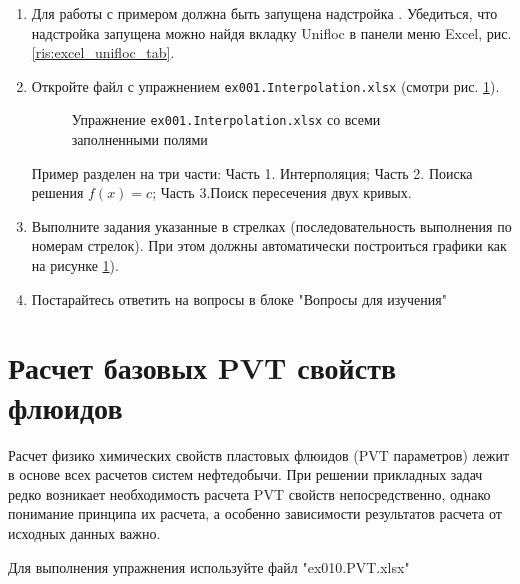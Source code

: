 \begin{enumerate}
	\item Для работы с примером должна быть запущена надстройка \unf{}. Убедиться, что надстройка запущена можно найдя вкладку Unifloc в панели меню Excel, рис. \ref{ris:excel_unifloc_tab}.
	

	
	\item Откройте файл с упражнением \texttt{ex001.Interpolation.xlsx} (смотри рис. \ref{ris:Ex001_1}).
	
	\begin{figure}[h!]
		\center{\texttt{[image: Ex001\_1]}}
		\caption{Упражнение \texttt{ex001.Interpolation.xlsx} со всеми заполненными полями}
		\label{ris:Ex001_1}
	\end{figure}
	
	Пример разделен на три части: Часть 1. Интерполяция; Часть 2. Поиска решения $f(x)=c$; Часть 3.Поиск пересечения двух кривых.
	
	\item Выполните задания указанные в стрелках (последовательность выполнения по номерам стрелок). При этом должны автоматически построиться графики как на рисунке \ref{ris:Ex001_1}).
	

	
	\item Постарайтесь ответить на вопросы в блоке "Вопросы для изучения"

\end{enumerate}

\section{Расчет базовых PVT свойств флюидов}

Расчет физико химических свойств пластовых флюидов (PVT параметров) лежит в основе всех расчетов систем нефтедобычи. При решении прикладных задач редко возникает необходимость расчета PVT свойств непосредственно, однако понимание принципа их расчета, а особенно зависимости результатов расчета от исходных данных важно.
   
Для выполнения упражнения используйте файл "ex010.PVT.xlsx"

